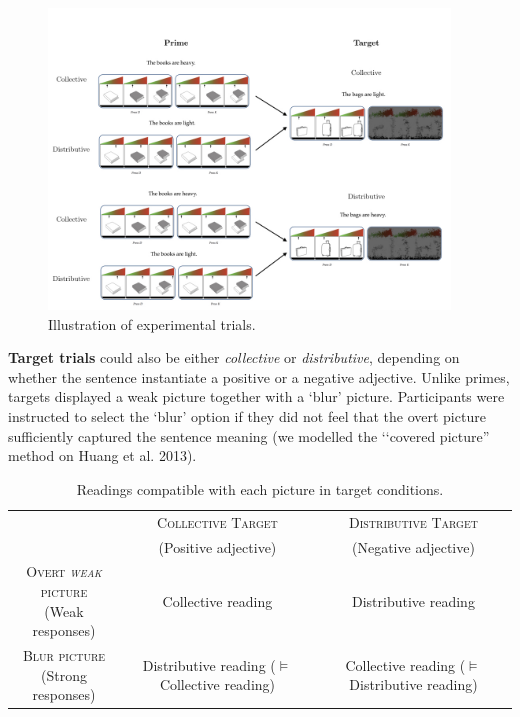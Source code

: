 \documentclass[a4paper, 11pt]{article}
\begin{document}
\begin{figure}[h!]
  \centering
    \includegraphics[width=0.95\textwidth]{exp1_matching.jpeg}
      \caption{Illustration of experimental trials.}
      \label{fig.examples.item.matching}
\end{figure}

\vspace{.5cm}


\noindent \textbf{Target trials} could also be either \textit{collective} or \textit{distributive}, depending on whether the sentence instantiate a positive or a negative adjective. Unlike primes, targets displayed a weak picture together with a `blur' picture. Participants were instructed to select the `blur' option if they did not feel that the overt picture sufficiently captured the sentence meaning (we modelled the ‘‘covered picture” method on Huang et al. 2013). 


\begin{table}[h]
\centering
\begin{tabular}{ccc}
\toprule
& \textsc{Collective Target} & \textsc{Distributive Target} \\
& (Positive adjective) & (Negative adjective) \\
 \cmidrule(r){2-3}
\parbox[c]{4cm}{\textsc{Overt \emph{weak} picture} \\ (Weak responses)} & Collective reading & Distributive reading  \\[0.5cm]
\parbox[c]{4cm}{\textsc{Blur picture} \\(Strong responses)} & \parbox[c]{4cm}{Distributive reading \\ ($\models$ Collective reading)}&  \parbox[c]{4.5cm}{Collective reading \\ ($\models$ Distributive reading)}  \\
\bottomrule
\end{tabular}
\caption{Readings compatible with each picture in target conditions.}\label{table:targetpictures}

\end{table}
\end{document}
